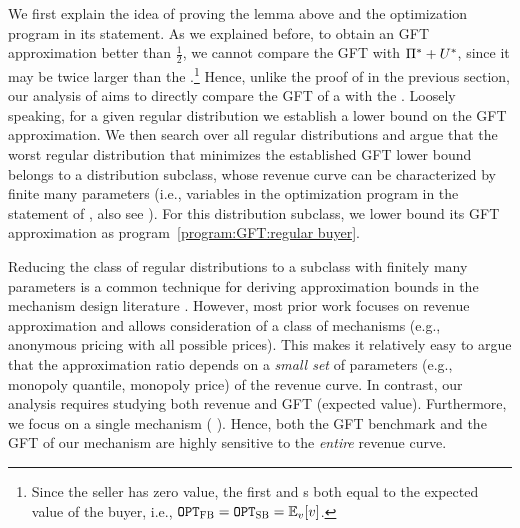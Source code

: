  We first explain the idea of proving the lemma above and the optimization program in its statement. As we explained before, to obtain an GFT approximation better than $\frac{1}{2}$, we cannot compare the GFT with $\Pi^* + U^*$, since it may be twice larger than the {\SecondBest}.\footnote{Since the seller has zero value, the first and {\SecondBest}s both equal to the expected value of the buyer, i.e., $\OPTFB = \OPTSB = \expect[\val]{\val}$.} Hence, unlike the proof of  in the previous section, our analysis of  aims to directly compare the GFT of a {\ksfair} {\FixPrice} with the {\SecondBest}. Loosely speaking, {for a given regular distribution} we establish a lower bound on the GFT approximation. We then search over all regular distributions and argue that the worst regular distribution that minimizes the established GFT lower bound belongs to a distribution subclass, whose revenue curve can be characterized by finite many parameters (i.e., variables in the optimization program in the statement of , also see ). For this distribution subclass, we lower bound its GFT approximation as program~\ref{program:GFT:regular buyer}.

Reducing the class of regular distributions to a subclass with finitely many parameters is a common technique for deriving approximation bounds in the mechanism design literature \citep[e.g.,][]{AHNPY-18, JLQTX-19, FHL-21, JL-23}. However, most prior work focuses on revenue approximation and allows consideration of a class of mechanisms (e.g., anonymous pricing with all possible prices). This makes it relatively easy to argue that the approximation ratio depends on a \emph{small set} of parameters (e.g., monopoly quantile, monopoly price) of the revenue curve. In contrast, our analysis requires studying both revenue and GFT (expected value). Furthermore, we focus on a single mechanism ({\ksfair} {\FixPrice}). Hence, both the GFT benchmark and the GFT of our mechanism are highly sensitive to the \emph{entire} revenue curve.

